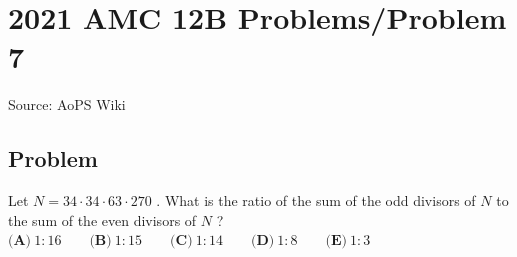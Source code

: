 \documentclass[12pt]{article}
\begin{document}
\section*{{2021 AMC 12B Problems/Problem 7}}
Source: AoPS Wiki

\subsection*{Problem}
Let $N = 34 \cdot 34 \cdot 63 \cdot 270$ . What is the ratio of the sum of the odd divisors of $N$ to the sum of the even divisors of $N$ ? $\textbf{(A)} ~1 : 16 \qquad\textbf{(B)} ~1 : 15 \qquad\textbf{(C)} ~1 : 14 \qquad\textbf{(D)} ~1 : 8 \qquad\textbf{(E)} ~1 : 3$
\end{document}
